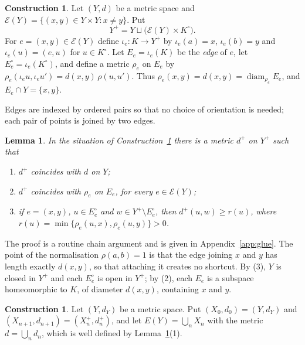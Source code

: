 \documentclass[11pt]{amsart}
\newtheorem{lemma}[theorem]{Lemma}
\theoremstyle{definition}
\newtheorem{construction}[theorem]{Construction}
\theoremstyle{remark}
\newcommand{\cE}{\mathcal{E}}
\newcommand{\diam}{\operatorname{diam}}
\numberwithin{equation}{section}
\begin{document}
\begin{construction}\label{con:plus}
Let $(Y,d)$ be a metric space and $\cE(Y)=\{(x,y)\in Y\times Y:x\ne y\}$. Put
\[Y^+=Y\sqcup\bigl(\cE(Y)\times K^\circ\bigr).\]
For $e=(x,y)\in\cE(Y)$ define $\iota_e\colon K\to Y^+$ by $\iota_e(a)=x$, $\iota_e(b)=y$ and $\iota_e(u)=(e,u)$ for $u\in K^\circ$. Let $E_e=\iota_e(K)$ be the \emph{edge} of $e$, let $E_e^\circ=\iota_e(K^\circ)$, and define a metric $\rho_e$ on $E_e$ by $\rho_e(\iota_eu,\iota_eu')=d(x,y)\,\rho(u,u')$. Thus $\rho_e(x,y)=d(x,y)=\diam_{\rho_e}E_e$, and $E_e\cap Y=\{x,y\}$.
\end{construction}
Edges are indexed by ordered pairs so that no choice of orientation is needed; each pair of points is joined by two edges.

\begin{lemma}\label{lem:plus}
In the situation of Construction~\ref{con:plus} there is a metric $d^+$ on $Y^+$ such that
\begin{enumerate}[label=\textup{(\arabic*)}]
\item $d^+$ coincides with $d$ on $Y$;
\item $d^+$ coincides with $\rho_e$ on $E_e$, for every $e\in\cE(Y)$;
\item if $e=(x,y)$, $u\in E_e^\circ$ and $w\in Y^+\setminus E_e^\circ$, then $d^+(u,w)\ge r(u)$, where $r(u)=\min\{\rho_e(u,x),\rho_e(u,y)\}>0$.
\end{enumerate}
\end{lemma}
The proof is a routine chain argument and is given in Appendix~\ref{app:glue}. The point of the normalisation $\rho(a,b)=1$ is that the edge joining $x$ and $y$ has length exactly $d(x,y)$, so that attaching it creates no shortcut. By (3), $Y$ is closed in $Y^+$ and each $E_e^\circ$ is open in $Y^+$; by (2), each $E_e$ is a subspace homeomorphic to $K$, of diameter $d(x,y)$, containing $x$ and $y$.

\begin{construction}\label{con:EY}
Let $(Y,d_Y)$ be a metric space. Put $(X_0,d_0)=(Y,d_Y)$ and $(X_{n+1},d_{n+1})=(X_n^+,d_n^+)$, and let $E(Y)=\bigcup_nX_n$ with the metric $d=\bigcup_nd_n$, which is well defined by Lemma~\ref{lem:plus}(1).
\end{construction}
\end{document}

